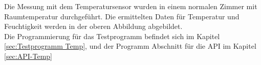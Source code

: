 Die Messung mit dem Temperatursensor wurden in einem normalen Zimmer mit Raumtemperatur durchgeführt. Die ermittelten Daten für Temperatur und Feuchtigkeit werden in der oberen Abbildung abgebildet.\\
\vspace{3mm}
Die Programmierung für das Testprogramm befindet sich im Kapitel \ref{sec:Testprogramm Temp}, und der Programm Abschnitt für die API im Kapitel \ref{sec:API-Temp}




